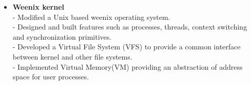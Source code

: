 \begin{itemize}

  \item \textbf{Weenix kernel} \\
 - Modified a Unix based weenix operating system.\\
 - Designed and built features such as processes, threads, context switching and synchronization primitives.\\
 - Developed a Virtual File System (VFS) to provide a common interface between kernel and other file systems. \\
 - Implemented Virtual Memory(VM) providing an abstraction of address space for user processes.


\end{itemize}

